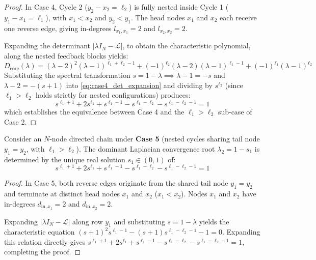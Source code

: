 \begin{proof}
In Case 4, Cycle 2 ($y_2 - x_2 = \ell_2$) is fully nested inside Cycle 1 ($y_1 - x_1 = \ell_1$), with $x_1 < x_2$ and $y_2 < y_1$. The head nodes $x_1$ and $x_2$ each receive one reverse edge, giving in-degrees $l_{x_1, x_1} = 2$ and $l_{x_2, x_2} = 2$. 

Expanding the determinant $|\lambda I_N - \mathcal{L}|$, to obtain the characteristic polynomial, along the nested feedback blocks yields:
\begin{equation}\label{eq:case4_det_expansion}
	D_{\text{core}}(\lambda) = (\lambda-2)^2 (\lambda-1)^{\ell_1+\ell_2-1} + (-1)^{\ell_2}(\lambda-2)(\lambda-1)^{\ell_1-1} + (-1)^{\ell_1}(\lambda-1)^{\ell_2}
\end{equation}
Substituting the spectral transformation $s = 1 - \lambda \implies \lambda - 1 = -s$ and $\lambda - 2 = -(s+1)$ into \eqref{eq:case4_det_expansion} and dividing by $s^{\ell_2}$ (since $\ell_1 > \ell_2$ holds strictly for nested configurations) produces:
\begin{equation}
	s^{\ell_1+1} + 2s^{\ell_1} + s^{\ell_1-1} - s^{\ell_1-\ell_2} - s^{\ell_1-\ell_2-1} = 1
\end{equation}
which establishes the equivalence between Case 4 and the $\ell_1 > \ell_2$ sub-case of Case 2.
\end{proof}

\begin{theo}\label{Theoremcase5}
Consider an $N$-node directed chain under \textbf{Case 5} (nested cycles sharing tail node $y_1 = y_2$, with $\ell_1 > \ell_2$). The dominant Laplacian convergence root $\lambda_2 = 1 - s_1$ is determined by the unique real solution $s_1 \in (0,1)$ of:
\begin{equation}\label{eq:case5_theorem_statement}
	s^{\ell_1+1} + 2s^{\ell_1} + s^{\ell_1-1} - s^{\ell_1-\ell_2} - s^{\ell_1-\ell_2-1} = 1
\end{equation}
\end{theo}

\begin{proof}
In Case 5, both reverse edges originate from the shared tail node $y_1 = y_2$ and terminate at distinct head nodes $x_1$ and $x_2$ ($x_1 < x_2$). Nodes $x_1$ and $x_2$ have in-degrees $d_{\text{in}, x_1} = 2$ and $d_{\text{in}, x_2} = 2$. 

Expanding $|\lambda I_N - \mathcal{L}|$ along row $y_1$ and substituting $s = 1 - \lambda$ yields the characteristic equation $(s+1)^2 s^{\ell_1-1} - (s+1) s^{\ell_1-\ell_2-1} - 1 = 0$. Expanding this relation directly gives $s^{\ell_1+1} + 2s^{\ell_1} + s^{\ell_1-1} - s^{\ell_1-\ell_2} - s^{\ell_1-\ell_2-1} = 1$, completing the proof.
\end{proof}

